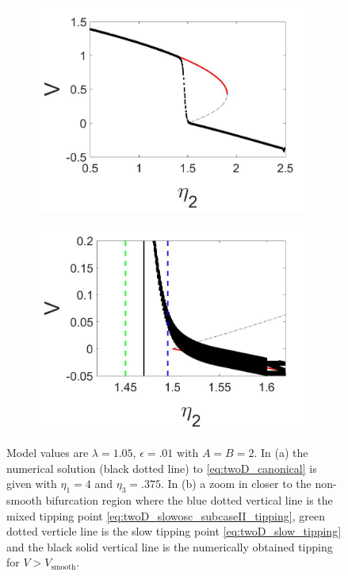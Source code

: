 \begin{figure}[H]
\centering
\begin{subfigure}{.5\textwidth}
 \centering
 \includegraphics[width=\linewidth]{twoD/slowosc_bif_diagram_medium.jpg}
 \caption{}
\end{subfigure}%
\begin{subfigure}{.5\textwidth}
 \centering
 \includegraphics[width=\linewidth]{twoD/slowosc_bif_diagram_medium_zoom.jpg}
 \caption{}
\end{subfigure}
\caption{Model values are $\lambda=1.05$, $\epsilon=.01$ with $A=B=2$. In (a) the numerical solution (black dotted line) to \eqref{eq:twoD_canonical} is given with $\eta_1=4$ and $\eta_3=.375$. In (b) a zoom in closer to the non-smooth bifurcation region where the blue dotted vertical line is the mixed tipping point \eqref{eq:twoD_slowosc_subcaseII_tipping}, green dotted verticle line is the slow tipping point \eqref{eq:twoD_slow_tipping} and the black solid vertical line is the numerically obtained tipping for $V>V_{\text{smooth}}$.}
\label{fig:twoD_slowosc_Vnumerics_medium}
\end{figure}

